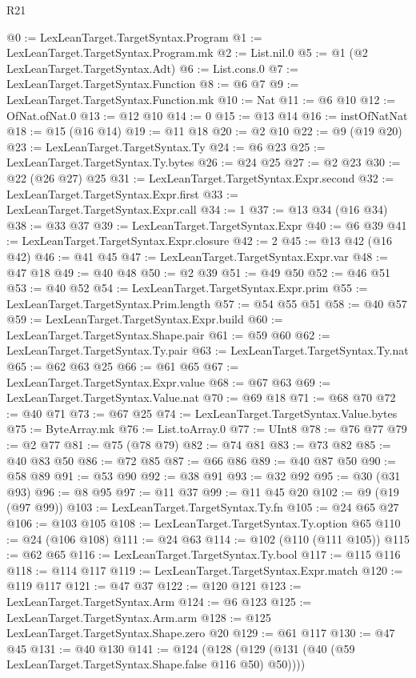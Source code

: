 \begin{lexlean}{R21}
\begin{coremodule}
{{{{{{{{{{{{{{{@0 := LexLeanTarget.TargetSyntax.Program
@1 := LexLeanTarget.TargetSyntax.Program.mk
@2 := List.nil.{0}
@5 := @1 (@2 LexLeanTarget.TargetSyntax.Adt)
@6 := List.cons.{0}
@7 := LexLeanTarget.TargetSyntax.Function
@8 := @6 @7
@9 := LexLeanTarget.TargetSyntax.Function.mk
@10 := Nat
@11 := @6 @10
@12 := OfNat.ofNat.{0}
@13 := @12 @10
@14 := 0
@15 := @13 @14
@16 := instOfNatNat
@18 := @15 (@16 @14)
@19 := @11 @18
@20 := @2 @10
@22 := @9 (@19 @20)
@23 := LexLeanTarget.TargetSyntax.Ty
@24 := @6 @23
@25 := LexLeanTarget.TargetSyntax.Ty.bytes
@26 := @24 @25
@27 := @2 @23
@30 := @22 (@26 @27) @25
@31 := LexLeanTarget.TargetSyntax.Expr.second
@32 := LexLeanTarget.TargetSyntax.Expr.first
@33 := LexLeanTarget.TargetSyntax.Expr.call
@34 := 1
@37 := @13 @34 (@16 @34)
@38 := @33 @37
@39 := LexLeanTarget.TargetSyntax.Expr
@40 := @6 @39
@41 := LexLeanTarget.TargetSyntax.Expr.closure
@42 := 2
@45 := @13 @42 (@16 @42)
@46 := @41 @45
@47 := LexLeanTarget.TargetSyntax.Expr.var
@48 := @47 @18
@49 := @40 @48
@50 := @2 @39
@51 := @49 @50
@52 := @46 @51
@53 := @40 @52
@54 := LexLeanTarget.TargetSyntax.Expr.prim
@55 := LexLeanTarget.TargetSyntax.Prim.length
@57 := @54 @55 @51
@58 := @40 @57
@59 := LexLeanTarget.TargetSyntax.Expr.build
@60 := LexLeanTarget.TargetSyntax.Shape.pair
@61 := @59 @60
@62 := LexLeanTarget.TargetSyntax.Ty.pair
@63 := LexLeanTarget.TargetSyntax.Ty.nat
@65 := @62 @63 @25
@66 := @61 @65
@67 := LexLeanTarget.TargetSyntax.Expr.value
@68 := @67 @63
@69 := LexLeanTarget.TargetSyntax.Value.nat
@70 := @69 @18
@71 := @68 @70
@72 := @40 @71
@73 := @67 @25
@74 := LexLeanTarget.TargetSyntax.Value.bytes
@75 := ByteArray.mk
@76 := List.toArray.{0}
@77 := UInt8
@78 := @76 @77
@79 := @2 @77
@81 := @75 (@78 @79)
@82 := @74 @81
@83 := @73 @82
@85 := @40 @83 @50
@86 := @72 @85
@87 := @66 @86
@89 := @40 @87 @50
@90 := @58 @89
@91 := @53 @90
@92 := @38 @91
@93 := @32 @92
@95 := @30 (@31 @93)
@96 := @8 @95
@97 := @11 @37
@99 := @11 @45 @20
@102 := @9 (@19 (@97 @99))
@103 := LexLeanTarget.TargetSyntax.Ty.fn
@105 := @24 @65 @27
@106 := @103 @105
@108 := LexLeanTarget.TargetSyntax.Ty.option @65
@110 := @24 (@106 @108)
@111 := @24 @63
@114 := @102 (@110 (@111 @105))
@115 := @62 @65
@116 := LexLeanTarget.TargetSyntax.Ty.bool
@117 := @115 @116
@118 := @114 @117
@119 := LexLeanTarget.TargetSyntax.Expr.match
@120 := @119 @117
@121 := @47 @37
@122 := @120 @121
@123 := LexLeanTarget.TargetSyntax.Arm
@124 := @6 @123
@125 := LexLeanTarget.TargetSyntax.Arm.arm
@128 := @125 LexLeanTarget.TargetSyntax.Shape.zero @20
@129 := @61 @117
@130 := @47 @45
@131 := @40 @130
@141 := @124 (@128 (@129 (@131 (@40 (@59 LexLeanTarget.TargetSyntax.Shape.false @116 @50) @50))))
}}}}}}}}}}}}}}}
\end{coremodule}
\end{lexlean}
